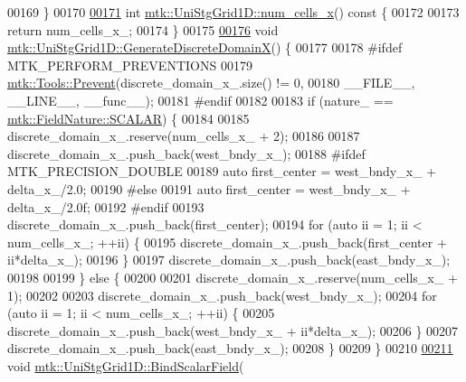 \begin{DoxyCode}
00169 \}
00170 
\hypertarget{mtk__uni__stg__grid__1d_8cc_source_l00171}{}\hyperlink{classmtk_1_1UniStgGrid1D_af1b3729d8afa07be5b2775ed68015b80}{00171} \textcolor{keywordtype}{int} \hyperlink{classmtk_1_1UniStgGrid1D_af1b3729d8afa07be5b2775ed68015b80}{mtk::UniStgGrid1D::num\_cells\_x}()\textcolor{keyword}{ const }\{
00172 
00173   \textcolor{keywordflow}{return} num\_cells\_x\_;
00174 \}
00175 
\hypertarget{mtk__uni__stg__grid__1d_8cc_source_l00176}{}\hyperlink{classmtk_1_1UniStgGrid1D_a36a7a85e237a4f85c603eac8cf67a704}{00176} \textcolor{keywordtype}{void} \hyperlink{classmtk_1_1UniStgGrid1D_a36a7a85e237a4f85c603eac8cf67a704}{mtk::UniStgGrid1D::GenerateDiscreteDomainX}() \{
00177 
00178 \textcolor{preprocessor}{  #ifdef MTK\_PERFORM\_PREVENTIONS}
00179   \hyperlink{classmtk_1_1Tools_a332324c6f25e66be9dff48c5987a3b9f}{mtk::Tools::Prevent}(discrete\_domain\_x\_.size() != 0,
00180                       \_\_FILE\_\_, \_\_LINE\_\_, \_\_func\_\_);
00181 \textcolor{preprocessor}{  #endif}
00182 
00183   \textcolor{keywordflow}{if} (nature\_ == \hyperlink{namespacemtk_ga4c54f2a329cfb4e56213b02a259d19e2a8f3d9a4b6a7b7f2c7afa61ca113d0db9}{mtk::FieldNature::SCALAR}) \{
00184 
00185     discrete\_domain\_x\_.reserve(num\_cells\_x\_ + 2);
00186 
00187     discrete\_domain\_x\_.push\_back(west\_bndy\_x\_);
00188 \textcolor{preprocessor}{    #ifdef MTK\_PRECISION\_DOUBLE}
00189     \textcolor{keyword}{auto} first\_center = west\_bndy\_x\_ + delta\_x\_/2.0;
00190 \textcolor{preprocessor}{    #else}
00191     \textcolor{keyword}{auto} first\_center = west\_bndy\_x\_ + delta\_x\_/2.0f;
00192 \textcolor{preprocessor}{    #endif}
00193     discrete\_domain\_x\_.push\_back(first\_center);
00194     \textcolor{keywordflow}{for} (\textcolor{keyword}{auto} ii = 1; ii < num\_cells\_x\_; ++ii) \{
00195       discrete\_domain\_x\_.push\_back(first\_center + ii*delta\_x\_);
00196     \}
00197     discrete\_domain\_x\_.push\_back(east\_bndy\_x\_);
00198 
00199   \} \textcolor{keywordflow}{else} \{
00200 
00201     discrete\_domain\_x\_.reserve(num\_cells\_x\_ + 1);
00202 
00203     discrete\_domain\_x\_.push\_back(west\_bndy\_x\_);
00204     \textcolor{keywordflow}{for} (\textcolor{keyword}{auto} ii = 1; ii < num\_cells\_x\_; ++ii) \{
00205       discrete\_domain\_x\_.push\_back(west\_bndy\_x\_ + ii*delta\_x\_);
00206     \}
00207     discrete\_domain\_x\_.push\_back(east\_bndy\_x\_);
00208   \}
00209 \}
00210 
\hypertarget{mtk__uni__stg__grid__1d_8cc_source_l00211}{}\hyperlink{classmtk_1_1UniStgGrid1D_ab49f0009b66b0a58ae7f70a538f4d12b}{00211} \textcolor{keywordtype}{void} \hyperlink{classmtk_1_1UniStgGrid1D_ab49f0009b66b0a58ae7f70a538f4d12b}{mtk::UniStgGrid1D::BindScalarField}(

\end{DoxyCode}
